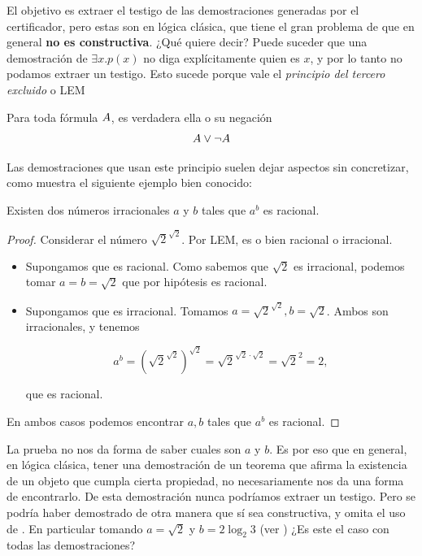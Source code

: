 El objetivo es extraer el testigo de las demostraciones generadas por el
certificador, pero estas son en lógica clásica, que tiene el gran problema de
que en general \textbf{no es constructiva}. ¿Qué quiere decir? Puede suceder que
una demostración de $\exists x . p(x)$ no diga explícitamente quien es $x$, y
por lo tanto no podamos extraer un testigo. Esto sucede porque vale el \textit{principio del tercero excluido} o LEM

\begin{prop}[LEM] Para toda fórmula $A$, es verdadera ella o su negación
    \[ A \vee \neg A \]
\end{prop}

Las demostraciones que usan este principio suelen dejar aspectos sin
concretizar, como muestra el siguiente ejemplo bien conocido:

\begin{theorem}\label{fri:thm:irrat}
    Existen dos números irracionales $a$ y $b$ tales que $a^b$ es racional.
\end{theorem}
\begin{proof}
    Considerar el número $\sqrt{2}^{\sqrt{2}}$. Por LEM, es o bien racional o
    irracional.
    \begin{itemize}
        \item Supongamos que es racional. Como sabemos que $\sqrt{2}$ es
              irracional, podemos tomar $a=b=\sqrt{2}$ que por hipótesis es racional.
        \item Supongamos que es irracional. Tomamos $a = \sqrt{2}^{\sqrt{2}}, b
                  = \sqrt{2}$. Ambos son irracionales, y tenemos

              \[
                  a^b
                  = \left( \sqrt{2}^{\sqrt{2}} \right)^{\sqrt{2}}
                  = \sqrt{2}^{\sqrt{2} \cdot \sqrt{2}}
                  = \sqrt{2}^{2}
                  = 2,
              \]

              que es racional.
    \end{itemize}

    En ambos casos podemos encontrar $a, b$ tales que $a^b$ es racional.
\end{proof}

La prueba no nos da forma de saber cuales son $a$ y $b$. Es por eso que en
general, en lógica clásica, tener una demostración de un teorema que afirma la
existencia de un objeto que cumpla cierta propiedad, no necesariamente nos da
una forma de encontrarlo. De esta demostración nunca podríamos extraer un testigo. Pero se podría haber demostrado de otra manera que sí sea constructiva, y omita el uso de . En particular tomando $a = \sqrt{2}$ y $b = 2 \log_2{3}$ (ver \cite{andrej-constructive}) ¿Es este el caso con todas las demostraciones?

